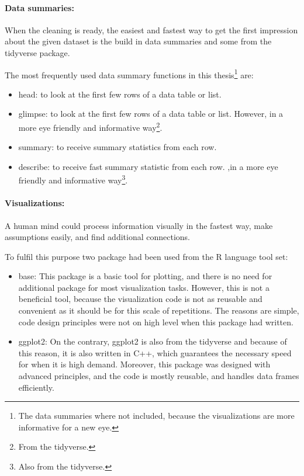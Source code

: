 		\paragraph{Data summaries:}
		When the cleaning is ready, the easiest and fastest way to get the first impression about the given dataset is the build in data summaries and some from the tidyverse package.

		The most frequently used data summary functions in this thesis\footnote{The data summaries where not included, because the visualizations are more informative for a new eye.} are:
		\begin{itemize}
			\item{head:} to look at the first few rows of a data table or list.
			\item{glimpse:} to look at the first few rows of a data table or list. However, in a more eye friendly and informative way\footnote{From the tidyverse.}.
			\item{summary:} to receive summary statistics from each row.
			\item{describe:} to receive fast summary statistic from each row. ,in  a more eye friendly and informative way\footnote{Also from the tidyverse.}.
		\end{itemize}
		\paragraph{Visualizations:}
		A human mind could process information visually in the fastest way, make assumptions easily, and find additional connections. 

		To fulfil this purpose two package had been used from the R language tool set:
		\begin{itemize}
			\item{base:} This package is a basic tool for plotting, and there is no need for additional package for most visualization tasks. However, this is not a beneficial tool, because the visualization code is not as reusable and convenient as it should be for this scale of repetitions. The reasons are simple, code design principles were not on high level when this package had written.
			\item{ggplot2:} On the contrary, ggplot2 is also from the tidyverse and because of this reason, it is also written in C++, which guarantees the necessary speed for when it is high demand. Moreover, this package was designed with advanced principles, and the code is mostly reusable, and handles data frames efficiently. 
		\end{itemize} 

